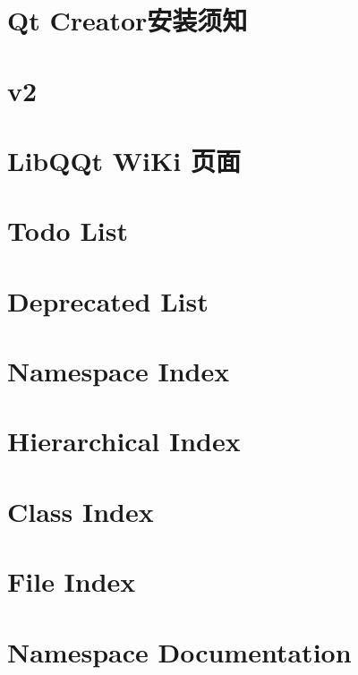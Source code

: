 \documentclass[twoside]{book}
\newcommand{\+}{\discretionary{\mbox{\scriptsize$\hookleftarrow$}}{}{}}
\begin{document}
\chapter{Qt Creator安装须知}
\label{md__r_1__develop_a0-develop__lib_q_qt_wiki_usage-_qt_creator}

\chapter{v2}
\label{md__r_1__develop_a0-develop__lib_q_qt_wiki_v2_81_85_80-is-stable}

\chapter{Lib\+Q\+Qt Wi\+Ki 页面}
\label{md__r_1__develop_a0-develop__lib_q_qt_wiki_wiki}

\chapter{Todo List}
\label{todo}

\chapter{Deprecated List}
\label{deprecated}

\chapter{Namespace Index}

\chapter{Hierarchical Index}

\chapter{Class Index}

\chapter{File Index}

\chapter{Namespace Documentation}

\end{document}
